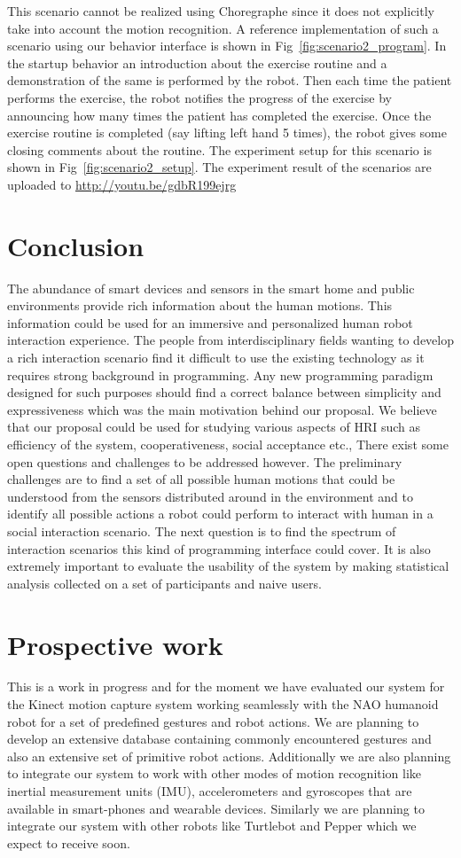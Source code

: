 \documentclass{llncs}
\begin{document}
	This scenario cannot be realized using Choregraphe since it does not explicitly take into account the motion recognition. A reference implementation of such a scenario using our behavior interface is shown in Fig~\ref{fig:scenario2_program}. In the startup behavior an introduction about the exercise routine and a demonstration of the same is performed by the robot. Then each time the patient performs the exercise, the robot notifies the progress of the exercise by announcing how many times the patient has completed the exercise. Once the exercise routine is completed (say lifting left hand 5 times), the robot gives some closing comments about the routine. The experiment setup for this scenario is shown in Fig~\ref{fig:scenario2_setup}. The experiment result of the scenarios are uploaded to \url{http://youtu.be/gdbR199ejrg}
\section{Conclusion}
\quad The abundance of smart devices and sensors in the smart home and public environments provide rich information about the human motions. This information could be used for an immersive and personalized human robot interaction experience. The people from interdisciplinary fields wanting to develop a rich interaction scenario find it difficult to use the existing technology as it requires strong background in programming. Any new programming paradigm designed for such purposes should find a correct balance between simplicity and expressiveness which was the main motivation behind our proposal. We believe that our proposal could be used for studying various aspects of HRI such as efficiency of the system, cooperativeness, social acceptance etc., There exist some open questions and challenges to be addressed however. The preliminary challenges are to find a set of all possible human motions that could be understood from the sensors distributed around in the environment and to identify all possible actions a robot could perform to interact with human in a social interaction scenario. The next question is to find the spectrum of interaction scenarios this kind of programming interface could cover. It is also extremely important to evaluate the usability of the system by making statistical analysis collected on a set of participants and naive users.
\section{Prospective work}
\quad This is a work in progress and for the moment we have evaluated our system for the Kinect motion capture system working seamlessly with the NAO humanoid robot for a set of predefined gestures and robot actions. We are planning to develop an extensive database containing commonly encountered gestures and also an extensive set of primitive robot actions. Additionally we are also planning to integrate our system to work with other modes of motion recognition like inertial measurement units (IMU), accelerometers and gyroscopes that are available in smart-phones and wearable devices. Similarly we are planning to integrate our system with other robots like Turtlebot and Pepper which we expect to receive soon.
\end{document}
